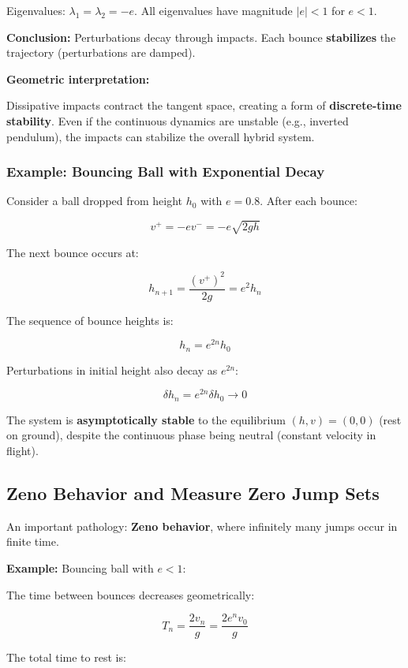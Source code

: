 \documentclass[
  letterpaper,
  DIV=11,
  numbers=noendperiod]{scrartcl}
\begin{document}
Eigenvalues: \(\lambda_1 = \lambda_2 = -e\). All eigenvalues have
magnitude \(|e| < 1\) for \(e < 1\).

\textbf{Conclusion:} Perturbations decay through impacts. Each bounce
\textbf{stabilizes} the trajectory (perturbations are damped).

\textbf{Geometric interpretation:}

Dissipative impacts contract the tangent space, creating a form of
\textbf{discrete-time stability}. Even if the continuous dynamics are
unstable (e.g., inverted pendulum), the impacts can stabilize the
overall hybrid system.

\subsubsection{Example: Bouncing Ball with Exponential
Decay}\label{example-bouncing-ball-with-exponential-decay}

Consider a ball dropped from height \(h_0\) with \(e = 0.8\). After each
bounce:

\[
v^+ = -e v^- = -e \sqrt{2gh}
\]

The next bounce occurs at:

\[
h_{n+1} = \frac{(v^+)^2}{2g} = e^2 h_n
\]

The sequence of bounce heights is:

\[
h_n = e^{2n} h_0
\]

Perturbations in initial height also decay as \(e^{2n}\):

\[
\delta h_n = e^{2n} \delta h_0 \to 0
\]

The system is \textbf{asymptotically stable} to the equilibrium
\((h, v) = (0, 0)\) (rest on ground), despite the continuous phase being
neutral (constant velocity in flight).

\subsection{Zeno Behavior and Measure Zero Jump
Sets}\label{zeno-behavior-and-measure-zero-jump-sets}

An important pathology: \textbf{Zeno behavior}, where infinitely many
jumps occur in finite time.

\textbf{Example:} Bouncing ball with \(e < 1\):

The time between bounces decreases geometrically:

\[
T_n = \frac{2v_n}{g} = \frac{2e^n v_0}{g}
\]

The total time to rest is:
\end{document}
